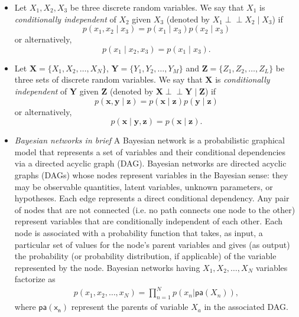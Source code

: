 \documentclass{tufte-handout}
\def\ci{\perp\!\!\!\perp}
\begin{document}
\begin{itemize}
 \item Let $X_1, X_2, X_3$ be three discrete random variables. We say that $X_1$ is \textit{conditionally independent} of $X_2$ given $X_3$ (denoted by $X_1 \ci X_2 \mid X_3$)  if
 \begin{equation*}  
 p(x_1, x_2\mid x_3) = p(x_1\mid x_3)p(x_2\mid x_3)
 \end{equation*}  
or alternatively,
 \begin{equation*}  
 p(x_1\mid x_2, x_3) = p(x_1\mid x_3).
  \end{equation*}  
  
\item  Let $\mathbf X = \{X_1, X_2,\dots,X_N\}$, $\mathbf Y = \{Y_1, Y_2,\dots,Y_M\}$ and $\mathbf Z = \{Z_1, Z_2,\dots,Z_L\}$ be three sets of discrete random variables. We say that $\mathbf X$ is \textit{conditionally independent} of $\mathbf Y$ given $\mathbf Z$ (denoted by $\mathbf X \ci \mathbf Y \mid \mathbf Z$)  if
 \begin{equation*}  
 p(\mathbf x, \mathbf y\mid \mathbf z) = p(\mathbf x\mid \mathbf z)p(\mathbf y\mid \mathbf z)
 \end{equation*}  
or alternatively,
 \begin{equation*}  
 p(\mathbf x\mid \mathbf y, \mathbf z) = p(\mathbf x\mid \mathbf z).
  \end{equation*}   

\item  \textit{Bayesian networks in brief}  A Bayesian network is a probabilistic graphical model that represents a set of variables and their conditional dependencies via a directed acyclic graph (DAG). 
Bayesian networks are directed acyclic graphs (DAGs) whose nodes represent variables in the Bayesian sense: they may be observable quantities, latent variables, unknown parameters, or hypotheses. Each edge represents a direct conditional dependency. Any pair of nodes that are not connected (i.e. no path connects one node to the other) represent variables that are conditionally independent of each other. Each node is associated with a probability function that takes, as input, a particular set of values for the node's parent variables and gives (as output) the probability (or probability distribution, if applicable) of the variable represented by the node. Bayesian networks having $X_1,X_2,\dots,X_N$  variables factorize as
\begin{align*}
p(x_1,x_2,\dots,x_N) = \prod_{n=1}^N p(x_n|\mathsf{pa}(X_n)),
\end{align*}
where $\mathsf{pa(x_n)}$ represent the parents of variable $X_a$ in the associated DAG.


\end{itemize}
\end{document}
